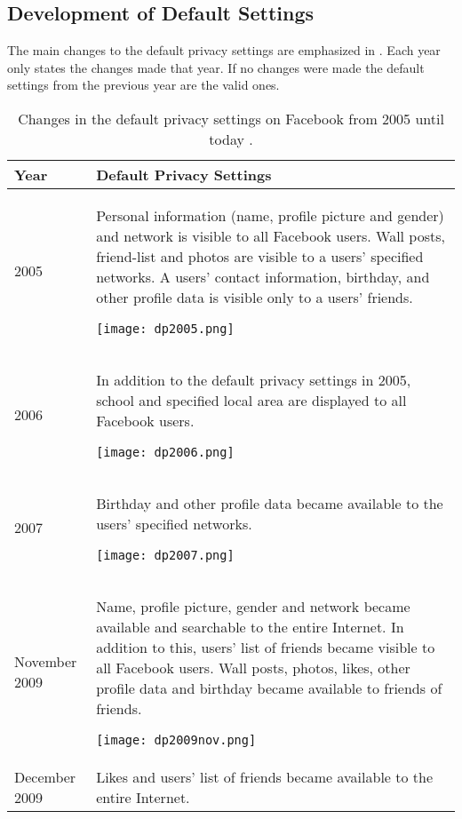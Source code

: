\subsection{Development of Default Settings}




The main changes to the default privacy settings are emphasized in . Each year only states the changes made that year. If no changes were made the default settings from the previous year are the valid ones. 

\begin{center}
\begin{longtable}{ | p{1.3cm} | p{10.6cm} |}
\caption{\label{tab:dps}Changes in the default privacy settings on Facebook from 2005 until today \cite{EvoPriv,PrivTimeline}.}\\
    \hline
    \textbf{Year} & \textbf{Default Privacy Settings} \\ 
    \hline
    2005 & Personal information (name, profile picture and gender) and network is visible to all Facebook users. Wall posts, friend-list and photos are visible to a users' specified networks. A users' contact information, birthday, and other profile data is visible only to a users' friends. 
    
    \texttt{[image: dp2005.png]}\\ 
    \hline
    2006 & In addition to the default privacy settings in 2005, school and specified local area are displayed to all Facebook users.  
    
    \texttt{[image: dp2006.png]} \\ 
    \hline
    2007 & Birthday and other profile data became available to the users' specified networks. 
    
    \texttt{[image: dp2007.png]}\\
    \hline
    November 2009 & Name, profile picture, gender and network became 			available and searchable to the entire Internet. In addition to this, users' list of friends became visible to all Facebook users. Wall posts, photos, likes, other profile data and birthday became available to friends of friends. 
    
    \texttt{[image: dp2009nov.png]}\\
	\hline
    December 2009 & Likes and users' list of friends became available to the entire Internet. 
    

\end{longtable}
\end{center}

